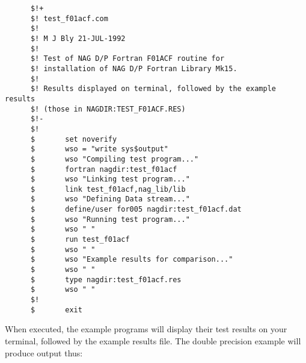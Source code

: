\begin{small}
\begin{verbatim}
      $!+                                                                 
      $! test_f01acf.com                                                  
      $!                                                                  
      $! M J Bly 21-JUL-1992                                              
      $!                                                                  
      $! Test of NAG D/P Fortran F01ACF routine for                       
      $! installation of NAG D/P Fortran Library Mk15.                    
      $!                                                                  
      $! Results displayed on terminal, followed by the example results   
      $! (those in NAGDIR:TEST_F01ACF.RES)                                
      $!-                                                                 
      $!                                                                  
      $       set noverify                                                
      $       wso = "write sys$output"                                    
      $       wso "Compiling test program..."                             
      $       fortran nagdir:test_f01acf                                  
      $       wso "Linking test program..."                               
      $       link test_f01acf,nag_lib/lib                                
      $       wso "Defining Data stream..."                               
      $       define/user for005 nagdir:test_f01acf.dat                   
      $       wso "Running test program..."                               
      $       wso " "                                                     
      $       run test_f01acf                                             
      $       wso " "                                                     
      $       wso "Example results for comparison..."                     
      $       wso " "                                                     
      $       type nagdir:test_f01acf.res                                 
      $       wso " "                                                     
      $!                                                                  
      $       exit                                                        
\end{verbatim}
\end{small}

When executed, the example programs will display their test results on your
terminal, followed by the example results file. The double precision example
will produce output thus:

